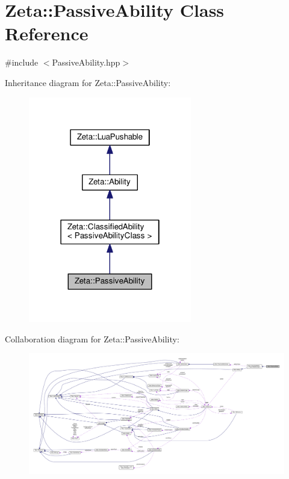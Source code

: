 \hypertarget{classZeta_1_1PassiveAbility}{\section{Zeta\+:\+:Passive\+Ability Class Reference}
\label{classZeta_1_1PassiveAbility}
}


{\ttfamily \#include $<$Passive\+Ability.\+hpp$>$}



Inheritance diagram for Zeta\+:\+:Passive\+Ability\+:\nopagebreak
\begin{figure}[H]
\begin{center}
\leavevmode
\includegraphics[width=202pt]{classZeta_1_1PassiveAbility__inherit__graph}
\end{center}
\end{figure}


Collaboration diagram for Zeta\+:\+:Passive\+Ability\+:
\nopagebreak
\begin{figure}[H]
\begin{center}
\leavevmode
\includegraphics[width=350pt]{classZeta_1_1PassiveAbility__coll__graph}
\end{center}
\end{figure}
